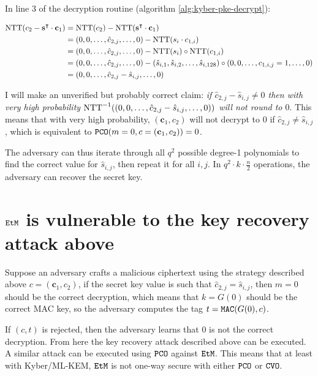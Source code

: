 \documentclass{article}
\begin{document}
In line 3 of the decryption routine (algorithm \ref{alg:kyber-pke-decrypt}):

\begin{equation*}
    \begin{aligned}
        \operatorname{NTT}(c_2 - \mathbf{s}^\intercal \cdot \mathbf{c}_1)
        &= \operatorname{NTT}(c_2) - \operatorname{NTT}(\mathbf{s}^\intercal \cdot \mathbf{c}_1) \\
        &= (0, 0, \ldots, \hat{c}_{2, j}, \ldots, 0)
            - \operatorname{NTT}(s_i \cdot c_{1, i}) \\
        &= (0, 0, \ldots, \hat{c}_{2, j}, \ldots, 0)
            - \operatorname{NTT}(s_i) \circ \operatorname{NTT}(c_{1, i}) \\
        &= (0, 0, \ldots, \hat{c}_{2, j}, \ldots, 0)
            - (\hat{s}_{i, 1}, \hat{s}_{i, 2}, \ldots, \hat{s}_{i, 128})
            \circ (0, 0, \ldots, c_{1, i, j} = 1, \ldots, 0) \\
        &= (0, 0, \ldots, \hat{c}_{2, j} - \hat{s}_{i, j}, \ldots, 0)
    \end{aligned}
\end{equation*}

I will make an unverified but probably correct claim: \emph{if $\hat{c}_{2, j} - \hat{s}_{i, j} \neq 0$ then with very high probability $\operatorname{NTT}^{-1}((0, 0, \ldots, \hat{c}_{2, j} - \hat{s}_{i, j}, \ldots, 0))$ will not round to $0$}. This means that with very high probability, $(\mathbf{c}_1, c_2)$ will not decrypt to $0$ if $\hat{c}_{2, j} \neq \hat{s}_{i, j}$, which is equivalent to $\texttt{PCO}(m=0, c=(\mathbf{c}_1, c_2)) = 0$.

The adversary can thus iterate through all $q^2$ possible degree-1 polynomials to find the correct value for $\hat{s}_{i, j}$, then repeat it for all $i, j$. In $q^2 \cdot k \cdot \frac{n}{2}$ operations, the adversary can recover the secret key.

\section{$\texttt{EtM}$ is vulnerable to the key recovery attack above}
Suppose an adversary crafts a malicious ciphertext using the strategy described above $c = (\mathbf{c}_1, c_2)$, if the secret key value is such that $\hat{c}_{2, j} = \hat{s}_{i, j}$, then $m = 0$ should be the correct decryption, which means that $k = G(0)$ should be the correct MAC key, so the adversary computes the tag $t = \texttt{MAC}(G(0), c)$.

If $(c, t)$ is rejected, then the adversary learns that $0$ is not the correct decryption. From here the key recovery attack described above can be executed. A similar attack can be executed using $\texttt{PCO}$ against $\texttt{EtM}$. This means that at least with Kyber/ML-KEM, $\texttt{EtM}$ is not one-way secure with either $\texttt{PCO}$ or $\texttt{CVO}$.
\end{document}
